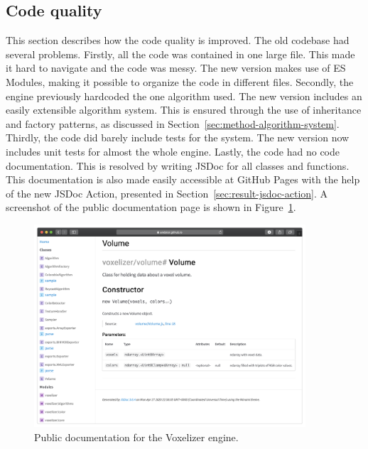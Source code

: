 \subsection{Code quality}
This section describes how the code quality is improved. The old codebase had several problems. Firstly, all the code was contained in one large file. This made it hard to navigate and the code was messy. The new version makes use of ES Modules, making it possible to organize the code in different files. Secondly, the engine previously hardcoded the one algorithm used. The new version includes an easily extensible algorithm system. This is ensured through the use of inheritance and factory patterns, as discussed in Section~\ref{sec:method-algorithm-system}. Thirdly, the code did barely include tests for the system. The new version now includes unit tests for almost the whole engine. Lastly, the code had no code documentation. This is resolved by writing JSDoc for all classes and functions. This documentation is also made easily accessible at GitHub Pages with the help of the new JSDoc Action, presented in Section~\ref{sec:result-jsdoc-action}. A screenshot of the public documentation page is shown in Figure~\ref{fig:result-voxelizer-documentation}.
\begin{figure}[htp]
    \centering
    \includegraphics[width=0.9\textwidth]{sections/result/figures/voxelizer-documentation.png}
    \caption{Public documentation for the Voxelizer engine.}
    \label{fig:result-voxelizer-documentation}
\end{figure}


